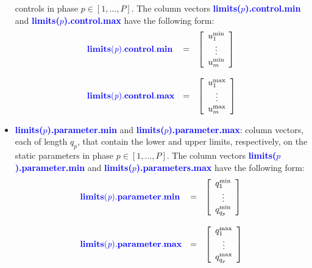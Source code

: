\documentclass[10pt]{article}
\newcommand{\bfblue}[1]{\textcolor{blue}{\bf #1}}
\begin{document}
\begin{itemize}
   controls in phase $p\in[1,\ldots,P]$.  The column vectors
   \bfblue{limits($p$).control.min} and \bfblue{limits($p$).control.max}
   have the following form:
     \begin{displaymath}
       \begin{array}{lcl}
         \bfblue{limits(\textit{p}).control.min} & = & \left[\begin{array}{c} u_{1}^{\textrm{min}}
             \\ \vdots \\ u_{m}^{\textrm{min}} \end{array} \right] \\ \\
             \bfblue{limits(\textit{p}).control.max} & = & \left[\begin{array}{c} u_{1}^{\textrm{max}}
                 \\ \vdots \\ u_{m}^{\textrm{max}} \end{array} \right]
           \end{array}
       \end{displaymath}
 \item \bfblue{limits($p$).parameter.min} and
   \bfblue{limits($p$).parameter.max}:  column vectors, each of length
   $q_p$, that contain the lower and upper limits, respectively, on the static
   parameters in phase $p\in[1,\ldots,P]$.  The column vectors
   \bfblue{limits($p$).parameter.min} and \bfblue{limits($p$).parameters.max}
   have the following form:
     \begin{displaymath}
       \begin{array}{lcl}
         \bfblue{limits(\textit{p}).parameter.min} & = & \left[\begin{array}{c}
           q_{1}^{\textrm{min}} \\ \vdots \\ q_{q_p}^{\textrm{min}} \\
         \end{array} \right] \\ \\
       \bfblue{limits(\textit{p}).parameter.max} & = & \left[\begin{array}{c}
           q_{1}^{\textrm{max}} \\ \vdots \\ q_{q_p}^{\textrm{max}} \\
         \end{array} \right]
       \end{array}

\end{displaymath}
\end{itemize}
\end{document}
